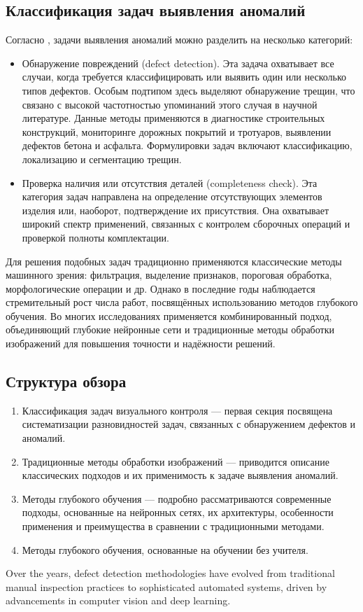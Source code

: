 \documentclass[14pt,a4paper]{article}
\begin{document}
\subsection*{Классификация задач выявления аномалий}
Согласно \cite{Hutten2024}, задачи выявления аномалий можно разделить на несколько категорий:
\begin{itemize}
	\item Обнаружение повреждений (defect detection). Эта задача охватывает все случаи, когда требуется классифицировать или выявить один или несколько типов дефектов. Особым подтипом здесь выделяют обнаружение трещин, что связано с высокой частотностью упоминаний этого случая в научной литературе. Данные методы применяются в диагностике строительных конструкций, мониторинге дорожных покрытий и тротуаров, выявлении дефектов бетона и асфальта. Формулировки задач включают классификацию, локализацию и сегментацию трещин.
	\item Проверка наличия или отсутствия деталей (completeness check). Эта категория задач направлена на определение отсутствующих элементов изделия или, наоборот, подтверждение их присутствия. Она охватывает широкий спектр применений, связанных с контролем сборочных операций и проверкой полноты комплектации.
\end{itemize}
Для решения подобных задач традиционно применяются классические методы машинного зрения: фильтрация, выделение признаков, пороговая обработка, морфологические операции и др. Однако в последние годы наблюдается стремительный рост числа работ, посвящённых использованию методов глубокого обучения. Во многих исследованиях применяется комбинированный подход, объединяющий глубокие нейронные сети и традиционные методы обработки изображений для повышения точности и надёжности решений.

\subsection*{Структура обзора}
\begin{enumerate}
	\item Классификация задач визуального контроля — первая секция посвящена систематизации разновидностей задач, связанных с обнаружением дефектов и аномалий.
	\item Традиционные методы обработки изображений — приводится описание классических подходов и их применимость к задаче выявления аномалий.
	\item Методы глубокого обучения — подробно рассматриваются современные подходы, основанные на нейронных сетях, их архитектуры, особенности применения и преимущества в сравнении с традиционными методами.
	\item Методы глубокого обучения, основанные на обучении без учителя.
\end{enumerate}
Over the years, defect detection methodologies have evolved from traditional manual inspection practices to sophisticated automated systems, driven by advancements in computer vision and deep learning.
\end{document}
